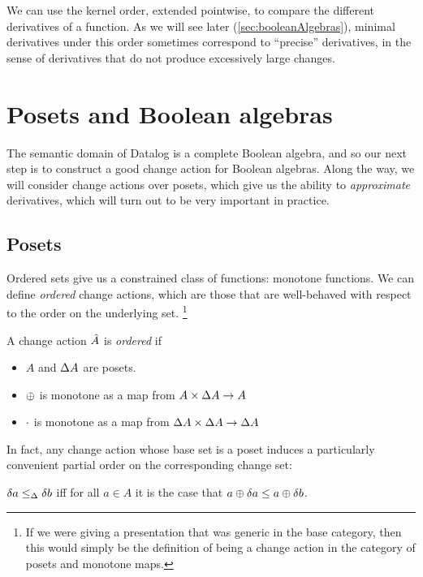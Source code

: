 We can use the kernel order, extended pointwise, to compare the different derivatives of a function.
As we will see later (\cref{sec:booleanAlgebras}), minimal derivatives under
this order sometimes correspond to ``precise'' derivatives, in the sense of derivatives that do not produce
excessively large changes.

\section{Posets and Boolean algebras}
\label{sec:moreStructures}

The semantic domain of Datalog is a complete Boolean algebra, and so our next
step is to construct a good change action for Boolean algebras. Along the way, we
will consider change actions over posets, which give us the ability to
\emph{approximate} derivatives, which will turn out to be very important in practice.

\subsection{Posets}

Ordered sets give us a constrained class of functions: monotone
functions. We can define \emph{ordered} change actions, which are those that
are well-behaved with respect to the order on the underlying set.
\footnote{If we were giving a presentation that was
generic in the base category, then this would simply be the definition of being
a change action in the category of posets and monotone maps.}

\begin{defn}
  A change action $\hat{A}$ is \emph{ordered} if
  \begin{itemize}
    \item $A$ and $\Delta A$ are posets.
    \item $\oplus$ is monotone as a map from $A \times \Delta A \rightarrow A$
    \item $\cdot$ is monotone as a map from $\Delta A \times \Delta A \rightarrow \Delta A$
  \end{itemize}
\end{defn}

In fact, any change action whose base set is a poset induces a particularly convenient partial order
on the corresponding change set:

\begin{defn}
  $\delta a \leq_\Delta \delta b$ iff for all $a \in A$ it is the case that
  $a \oplus \delta a \leq a \oplus \delta b$.
\end{defn}

